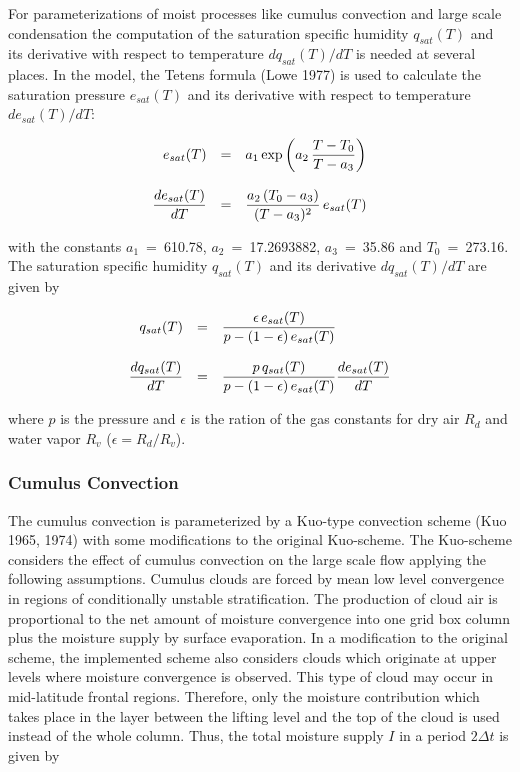 For parameterizations of  moist processes like cumulus
convection and large scale condensation
the computation of the saturation specific humidity
$q_{sat}(T)$ and its derivative with respect
to temperature $dq_{sat}(T)/dT$ is needed at several
places. In
the model, the Tetens formula  (Lowe 1977)  is used to
calculate the saturation pressure
$e_{sat} (T)$ and its derivative with respect to
temperature $de_{sat}(T)/dT$:

\begin{equation}
\begin{array}{rcl}
\displaystyle e_{sat}(T) & = & \displaystyle a_1 \exp{\left(a_2 \,
\frac{T-T_0}{T-a_3}\right)} \\
&& \\
\displaystyle \frac{de_{sat}(T)}{dT} & = & \displaystyle \frac{a_2 \, (T_0
- a_3)}{(T-a_3)^2} \, e_{sat}(T) 
\end{array}
\end{equation}

with the constants $a_1$~=~610.78,
$a_2$~=~17.2693882, $a_3$~=~35.86 and
$T_0$~=~273.16. The
saturation specific humidity $q_{sat}(T)$ and its
derivative $dq_{sat}(T)/dT$ are given by

\begin{equation}\label{qsat}
\begin{array}{rcl}
\displaystyle q_{sat}(T) & = & \displaystyle \frac{\epsilon \,
e_{sat}(T)}{p-(1-\epsilon  )\,  e_{sat}
(T)} \\
&&\\
\displaystyle \frac{dq_{sat}(T)}{dT} & = & \displaystyle \frac{p \,
q_{sat}(T)}{p-(1-\epsilon)\,  e_{sat}
(T)} \frac{de_{sat}(T)}{dT}\\
\end{array}
\end{equation}

where $p$ is the pressure and  $\epsilon$ is the ration
of the gas constants
for dry air $R_d$ and water vapor $R_v$ ($\epsilon =
R_d / R_v$). 


\subsubsection{Cumulus Convection}

The cumulus convection is parameterized by a
Kuo-type convection scheme (Kuo 1965, 1974)
with some modifications to the original Kuo-scheme.
The Kuo-scheme considers the effect of
cumulus convection on the large scale flow applying
the following assumptions. Cumulus
clouds are forced by mean low level convergence in
regions of conditionally unstable
stratification. The production of cloud air is
proportional to the net amount of moisture
convergence into one grid box column plus the
moisture supply by surface evaporation. In a
modification to the original scheme, the implemented
scheme also considers clouds which
originate at upper levels where moisture convergence
is observed. This type of cloud may occur
in mid-latitude frontal regions. Therefore, only the
moisture contribution which takes place in
the layer between the lifting level and the top of the
cloud is used instead of the whole column.
Thus, the total moisture supply $I$ in a period $2
\Delta t$ is given by 

